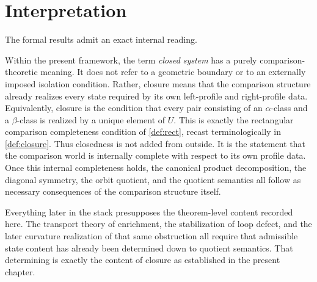 \section{Interpretation}
\label{sec:closure-interpretation}
The formal results admit an exact internal reading.
\begin{remark}
	Within the present framework, the term \emph{closed system} has a purely
	comparison-theoretic meaning. It does not refer to a geometric boundary
	or to an externally imposed isolation condition. Rather, closure means
	that the comparison structure already realizes every state required by
	its own left-profile and right-profile data.
	Equivalently, closure is the condition that every pair consisting of an
	\(\alpha\)-class and a \(\beta\)-class is realized by a unique element
	of \(U\). This is exactly the rectangular comparison completeness
	condition of \cref{def:rect}, recast terminologically in
	\cref{def:closure}.
	Thus closedness is not added from outside. It is the statement that the
	comparison world is internally complete with respect to its own profile
	data. Once this internal completeness holds, the canonical product
	decomposition, the diagonal symmetry, the orbit quotient, and the
	quotient semantics all follow as necessary consequences of the
	comparison structure itself.
\end{remark}
\begin{remark}
	Everything later in the stack presupposes the theorem-level content
	recorded here. The transport theory of enrichment, the stabilization of
	loop defect, and the later curvature realization of that same
	obstruction all require that admissible state content has already
	been determined down to quotient semantics. That determining is exactly
	the content of closure as established in the present chapter.
\end{remark}

